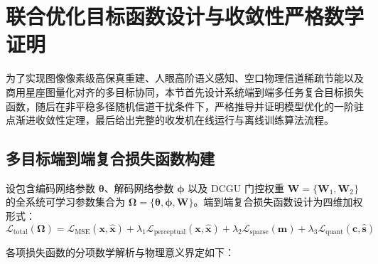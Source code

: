 \section{联合优化目标函数设计与收敛性严格数学证明}
\label{sec:3_4_loss_and_convergence}

为了实现图像像素级高保真重建、人眼高阶语义感知、空口物理信道稀疏节能以及商用星座图量化对齐的多目标协同，本节首先设计系统端到端多任务复合目标损失函数，随后在非平稳多径随机信道干扰条件下，严格推导并证明模型优化的一阶驻点渐进收敛性定理，最后给出完整的收发机在线运行与离线训练算法流程。

\subsection{多目标端到端复合损失函数构建}
设包含编码网络参数 $\bm{\theta}$、解码网络参数 $\bm{\phi}$ 以及 DCGU 门控权重 $\bm{W} = \{\bm{W}_1, \bm{W}_2\}$ 的全系统可学习参数集合为 $\bm{\Omega} = \{\bm{\theta}, \bm{\phi}, \bm{W}\}$。端到端复合损失函数设计为四维加权形式：
\begin{equation}
  \mathcal{L}_{\text{total}}(\bm{\Omega}) = \mathcal{L}_{\text{MSE}}(\bm{x}, \hat{\bm{x}}) + \lambda_1 \mathcal{L}_{\text{perceptual}}(\bm{x}, \hat{\bm{x}}) + \lambda_2 \mathcal{L}_{\text{sparse}}(\bm{m}) + \lambda_3 \mathcal{L}_{\text{quant}}(\bm{c}, \hat{\bm{s}})
  \label{eq:total_loss_deep}
\end{equation}

各项损失函数的分项数学解析与物理意义界定如下：

